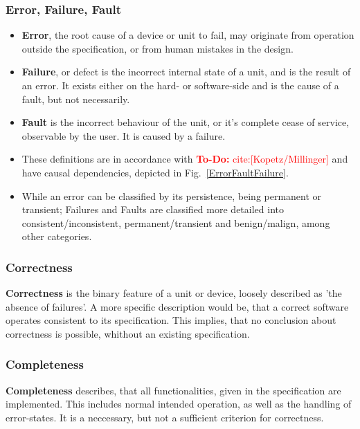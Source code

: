 \documentclass[master,english,smartquotes,apa]{hgbthesis}
\newcommand{\TODO}[1]{\textcolor{red}{\textbf{To-Do:} #1}}
\begin{document}
	\subsubsection{Error, Failure, Fault}
	\begin{minipage}{\linewidth}
	\begin{itemize}
		\item {\bf Error}, the root cause of a device or unit to fail, may originate from operation outside the specification, or from human mistakes in the design.
		\item {\bf Failure}, or defect is the incorrect internal state of a unit, and is the result of an error. It exists either on the hard- or software-side and is the cause of a fault, but not necessarily.
		\item {\bf Fault} is the incorrect behaviour of the unit, or it's complete cease of service, observable by the user. It is caused by a failure.
		\item These definitions are in accordance with \TODO{cite:[Kopetz/Millinger]} and have causal dependencies, depicted in Fig.~\ref{ErrorFaultFailure}.
		\item While an error can be classified by its persistence, being permanent or transient; Failures and Faults are classified more detailed into consistent/inconsistent, permanent/transient and benign/malign, among other categories.
	\end{itemize}
	\end{minipage}
	
	\subsubsection{Correctness}
		{\bf Correctness} is the binary feature of a unit or device, loosely described as 'the absence of failures'. A more specific description would be, that a correct software operates consistent to its specification. This implies, that no conclusion about correctness is possible, whithout an existing specification.
	\subsubsection{Completeness}
		{\bf Completeness} describes, that all functionalities, given in the specification are implemented. This includes normal intended operation, as well as the handling of error-states. It is a neccessary, but not a sufficient criterion for correctness.
\end{document}
